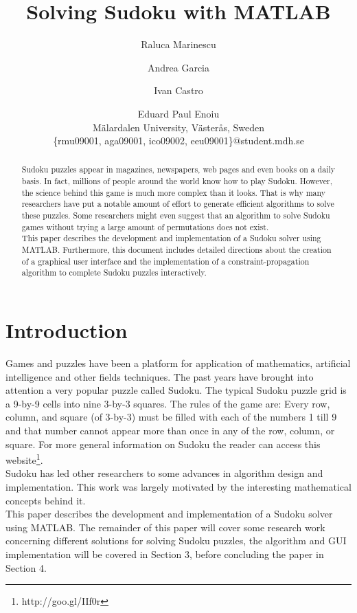 \documentclass[12pt,a4paper]{article} %
\title{\bf{Solving Sudoku with MATLAB}} %
\author{Raluca Marinescu \and Andrea Garcia \and Ivan Castro \and Eduard Paul Enoiu \\
  Mälardalen University, Västerås, Sweden\\
  \textsf{\{rmu09001, aga09001,  ico09002, eeu09001\}@student.mdh.se}}
\begin{document}
\maketitle %
\begin{abstract}
Sudoku puzzles appear in magazines, newspapers, web pages and even books on a daily basis. In fact, millions of people around the world know how to play Sudoku. However, the science behind this game is much more complex than it looks. That is why many researchers have put a notable amount of effort to generate efficient algorithms to solve these puzzles. Some researchers might even suggest that an algorithm to solve Sudoku games without trying a large amount of permutations does not exist.\newline
\\This paper describes the development and implementation of a Sudoku solver using MATLAB. Furthermore, this document includes detailed directions about the creation of a graphical user interface and the implementation of a constraint-propagation algorithm to complete Sudoku puzzles interactively.

\end{abstract}
\newpage
\tableofcontents
\newpage
\section{Introduction}
Games and puzzles have been a platform for application of mathematics, artificial intelligence and other fields techniques. The past years have brought into attention a very popular puzzle called Sudoku. The typical Sudoku puzzle grid is a 9-by-9 cells into nine 3-by-3 squares. The rules of the game are: Every row, column, and square (of 3-by-3) must be filled with each of the numbers 1 till 9 and that number cannot appear more than once in any of the row, column, or square. For more general information on Sudoku the reader can access this website\footnote{http://goo.gl/IIf0r}.
\newline
\\Sudoku has led other researchers to some advances in algorithm design and implementation. This work was largely motivated by the interesting mathematical concepts behind it.
\newline
\\ This paper describes the development and implementation of a Sudoku solver using MATLAB. The remainder of this paper will cover some research work concerning different solutions for solving Sudoku puzzles, the algorithm and GUI implementation will be covered in Section 3, before concluding the paper in Section 4.
\end{document}
